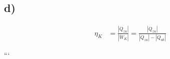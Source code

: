 

\subsection*{d)}

\begin{align*}
\eta_K &= \frac{\left| \dot{Q}_{zu} \right|}{\left| \dot{W}_K \right|} = \frac{\left| \dot{Q}_{zu} \right|}{\left| \dot{Q}_{zu} \right| - \left| \dot{Q}_{ab} \right|}
\end{align*}

```